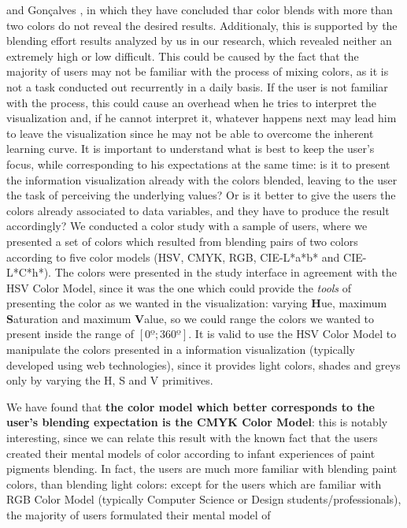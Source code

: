 and Gonçalves \cite{Gama20141}, in which they have concluded thar color blends with more than two colors do not reveal the desired results. Additionaly, this
is supported by the blending effort results analyzed by us in our research, which revealed neither an extremely high or low difficult. This could be caused by
the fact that the majority of users may not be familiar with the process of mixing colors, as it is not a task conducted out recurrently in a daily basis.
If the user is not familiar with the process, this could cause an overhead when he tries to interpret the visualization and, if he cannot interpret it, whatever
happens next may lead him to leave the visualization since he may not be able to overcome the inherent learning curve.
It is important to understand what is best to keep the user's focus, while corresponding to his expectations at the same time: is it to present the
information visualization already with the colors blended, leaving to the user the task of perceiving the underlying values? Or is it better to give
the users the colors already associated to data variables, and they have to produce the result accordingly? We conducted a color study with a sample of users, where we presented
a set of colors which resulted from blending pairs of two colors according to five color models (HSV, CMYK, RGB, CIE-L*a*b* and CIE-L*C*h*). The colors
were presented in the study interface in agreement with the HSV Color Model, since it was the one which could provide the \emph{tools} of presenting the
color as we wanted in the visualization: varying \textbf{H}ue, maximum \textbf{S}aturation and maximum \textbf{V}alue, so we could range the colors we
wanted to present inside the range of $[0º ; 360º]$. It is valid to use the HSV Color Model to manipulate the colors presented in a information
visualization (typically developed using web technologies), since it provides light colors, shades and greys only by varying the H, S and V primitives. \par
%
We have found that \textbf{the color model which better corresponds to the user's blending expectation is the CMYK Color Model}: this is
notably interesting, since we can relate this result with the known fact that the users created their mental models of color according to infant
experiences of paint pigments blending. In fact, the users are much more familiar with blending paint colors, than blending light colors: except
for the users which are familiar with RGB Color Model (typically Computer Science or Design students/professionals), the majority of users formulated their mental model of
